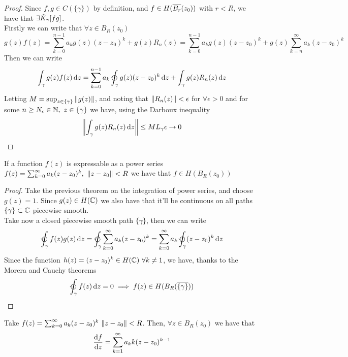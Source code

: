 \documentclass[../complete.tex]{subfiles}
\begin{document}
\begin{proof}
	Since $f,g\in C(\{\gamma\})$ by definition, and $f\in H(\overline{B_r}(z_0))$ with $r<R$, we have that $\exists\hat{K}_\gamma[fg]$.\\
	Firstly we can write that $\forall z\in B_R(z_0)$
	\begin{equation*}
		g(z)f(z)=\sum_{k=0}^{n-1}a_kg(z)(z-z_0)^k+g(z)R_n(z)=\sum_{k=0}^{n-1}a_kg(z)(z-z_0)^k+g(z)\sum_{k=n}^\infty a_k(z-z_0)^k
	\end{equation*}
	Then we can write
	\begin{equation*}
		\int_{\gamma}^{}g(z)f(z)\diff z=\sum_{k=0}^{n-1}a_k\ointccw_\gamma g(z)(z-z_0)^k\diff z+\int_{\gamma}^{}g(z)R_n(z)\diff z
	\end{equation*}
	Letting $M=\sup_{z\in\{\gamma\}}\norm{g(z)}$, and noting that $\norm{R_n(z)}<\epsilon$ for $\forall\epsilon>0$ and for some $n\ge N_\epsilon\in\N,\ z\in\{\gamma\}$ we have, using the Darboux inequality
	\begin{equation*}
		\norm{\int_{\gamma}^{}g(z)R_n(z)\operatorname{d\!} z}\le ML_\gamma\epsilon\to0
	\end{equation*}
\end{proof}
\begin{thm}
	If a function $f(z)$ is expressable as a power series $f(z)=\sum_{k=0}^\infty a_k(z-z_0)^k,\ \norm{z-z_0}<R$ we have that $f\in H(B_R(z_0))$
\end{thm}
\begin{proof}
	Take the previous theorem on the integration of power series, and choose $g(z)=1$. Since $g(z)\in H(\mathbb{C})$ we also have that it'll be continuous on all paths $\{\gamma\}\subset\mathbb{C}$ piecewise smooth.\\
	Take now a closed piecewise smooth path $\{\gamma\}$, then we can write
	\begin{equation*}
		\ointccw_\gamma f(z)g(z)\diff z=\ointccw_\gamma\sum_{k=0}^\infty a_k(z-z_0)^k=\sum_{k=0}^\infty a_k\ointccw_\gamma(z-z_0)^k\diff z
	\end{equation*}
	Since the function $h(z)=(z-z_0)^k\in H(\mathbb{C})\ \forall k\ne1$, we have, thanks to the Morera and Cauchy theorems
	\begin{equation*}
		\ointccw_\gamma f(z)\diff z=0\implies f(z)\in H(B_R(\cc{\{\gamma\}}))
	\end{equation*}
\end{proof}
\begin{cor}
	Take $f(z)=\sum_{k=0}^\infty a_k(z-z_0)^k\ \norm{z-z_0}<R$. Then, $\forall z\in B_R(z_0)$ we have that
	\begin{equation}
		\derivative{f}{z}=\sum_{k=1}^\infty a_kk(z-z_0)^{k-1}
		\label{eq:derivativeps2}
	\end{equation}
\end{cor}
\end{document}
